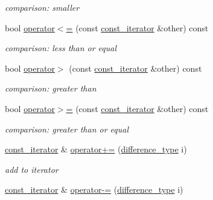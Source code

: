 \begin{DoxyCompactItemize}
\begin{DoxyCompactList}\small\item\em comparison\+: smaller \end{DoxyCompactList}\item 
bool \hyperlink{a00038_a6b682f09787eff62f03493d45aa05902}{operator$<$=} (const \hyperlink{a00038}{const\+\_\+iterator} \&other) const \hypertarget{a00038_a6b682f09787eff62f03493d45aa05902}{}\label{a00038_a6b682f09787eff62f03493d45aa05902}

\begin{DoxyCompactList}\small\item\em comparison\+: less than or equal \end{DoxyCompactList}\item 
bool \hyperlink{a00038_acb6cd0ff760933afeb7f93e5207f3646}{operator$>$} (const \hyperlink{a00038}{const\+\_\+iterator} \&other) const \hypertarget{a00038_acb6cd0ff760933afeb7f93e5207f3646}{}\label{a00038_acb6cd0ff760933afeb7f93e5207f3646}

\begin{DoxyCompactList}\small\item\em comparison\+: greater than \end{DoxyCompactList}\item 
bool \hyperlink{a00038_af6941c3711dabb2e64960dd57e00d201}{operator$>$=} (const \hyperlink{a00038}{const\+\_\+iterator} \&other) const \hypertarget{a00038_af6941c3711dabb2e64960dd57e00d201}{}\label{a00038_af6941c3711dabb2e64960dd57e00d201}

\begin{DoxyCompactList}\small\item\em comparison\+: greater than or equal \end{DoxyCompactList}\item 
\hyperlink{a00038}{const\+\_\+iterator} \& \hyperlink{a00038_a0d5820d1dda9dea3bbeb029cacf68522}{operator+=} (\hyperlink{a00038_a49d7c3e9ef3280df03052cce988b792f}{difference\+\_\+type} i)\hypertarget{a00038_a0d5820d1dda9dea3bbeb029cacf68522}{}\label{a00038_a0d5820d1dda9dea3bbeb029cacf68522}

\begin{DoxyCompactList}\small\item\em add to iterator \end{DoxyCompactList}\item 
\hyperlink{a00038}{const\+\_\+iterator} \& \hyperlink{a00038_aefac8f3e390ac917f021761f4a8f8e71}{operator-\/=} (\hyperlink{a00038_a49d7c3e9ef3280df03052cce988b792f}{difference\+\_\+type} i)\hypertarget{a00038_aefac8f3e390ac917f021761f4a8f8e71}{}\label{a00038_aefac8f3e390ac917f021761f4a8f8e71}


\end{DoxyCompactItemize}
